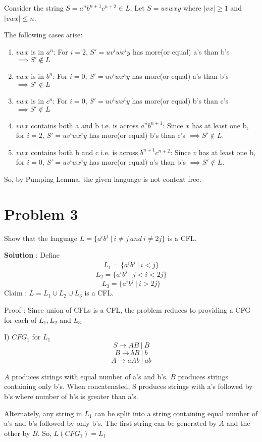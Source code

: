 \documentclass{article}
\begin{document}
    Consider the string $S = a^nb^{n+1}c^{n+2} \in L $. Let $S = uvwxy$ where $|vx|\geq 1$ and $|vwx| \leq n$.
    
    The following cases arise:
    \begin{enumerate}
        \item $vwx$ is in $a^n$: For $i=2$, $S' = uv^iwx^iy$ has more(or equal) a's than b's $\implies S' \notin L$ 
        \item $vwx$ is in $b^n$: For $i=0$, $S' = uv^iwx^iy$ has more(or equal) a's than b's $\implies S' \notin L$
        \item $vwx$ is in $c^n$: For $i=0$, $S' = uv^iwx^iy$ has more(or equal) b's than c's $\implies S' \notin L$
        \item $vwx$ contains both a and b i.e. is across $a^nb^{n+1}$: Since $x$ has at least one b,  for $i=2$, $S' = uv^iwx^iy$ has more(or equal) b's than c's $\implies S' \notin L$.
        \item $vwx$ contains both b and c i.e. is across $b^{n+1}c^{n+2}$: Since $v$ has at least one b,  for $i=0$, $S' = uv^iwx^iy$ has more(or equal) a's than b's $\implies S' \notin L$.
    \end{enumerate}
    So, by Pumping Lemma, the given language is not context free.
    
    \section*{Problem 3} Show that the language $L = \{a^ib^j~|~i\neq j \ and \ i\neq 2j\}$ is a CFL.
    
    \textbf{Solution} : Define
    $$L_1 =\{a^ib^j~|~i < j\}$$
    $$L_2 =\{a^ib^j~|~j < i < 2j\}$$
    $$L_3 =\{a^ib^j~|~i > 2j\}$$
    Claim : $L = L_1 \cup L_2 \cup L_3$ is a CFL.
    
    Proof : Since union of CFLs is a CFL, the problem reduces to providing a CFG for each of $L_1, L_2$ and $L_3$
    
    I) $CFG_1$ for $L_1$
    $$S \rightarrow AB\ | \ B$$
    $$B \rightarrow bB\ |\ b$$
    $$A \rightarrow aAb\ |\ ab$$
    
    \quad $A$ produces strings with equal number of a's and b's. $B$ produces strings containing only b's. When concatenated, S produces strings with a's followed by b's where number of b's is greater than a's. 
    
    \quad Alternately, any string in $L_1$ can be split into a string containing equal number of a's and b's followed by only b's. The first string can be generated by $A$ and the other by $B$. So, $L(CFG_1)  = L_1$
    
\end{document}
